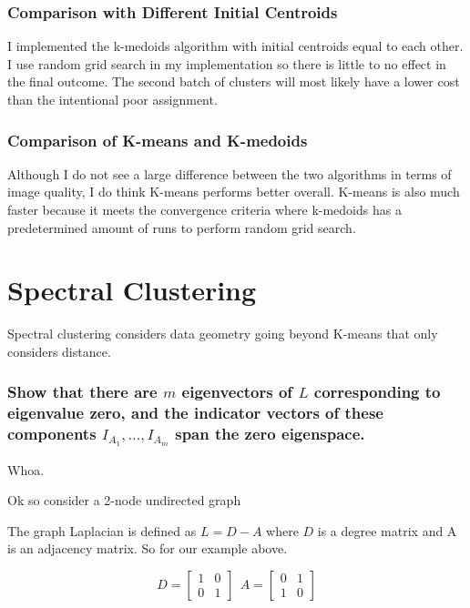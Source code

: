 \documentclass[a4paper]{article}
\begin{document}
\subsubsection{Comparison with Different Initial Centroids}
I implemented the k-medoids algorithm with initial centroids equal to each other.  I use random grid search in my implementation so there is little to no effect in the final outcome.  The second batch of clusters will most likely have a lower cost than the intentional poor assignment.
\subsubsection{Comparison of K-means and K-medoids}
Although I do not see a large difference between the two algorithms in terms of image quality, I do think K-means performs better overall.  K-means is also much faster because it meets the convergence criteria where k-medoids has a predetermined amount of runs to perform random grid search.

\section{Spectral Clustering}
Spectral clustering considers data geometry going beyond K-means that only considers distance.
\subsubsection{Show that there are $m$ eigenvectors of $L$ corresponding to eigenvalue zero, and the indicator vectors of these components $I_{A_1} , . . . , I_{A_m}$ span the zero eigenspace.}

Whoa.

Ok so consider a 2-node undirected graph

The graph Laplacian is defined as $L = D - A $ where $D$ is a degree matrix and A is an adjacency matrix.  So for our example above. 

$$
D = 
\begin{bmatrix} 
1 & 0 \\
0 & 1 
\end{bmatrix}\ \
A = 
\begin{bmatrix} 
0 & 1 \\
1 & 0 
\end{bmatrix}
$$
\end{document}
